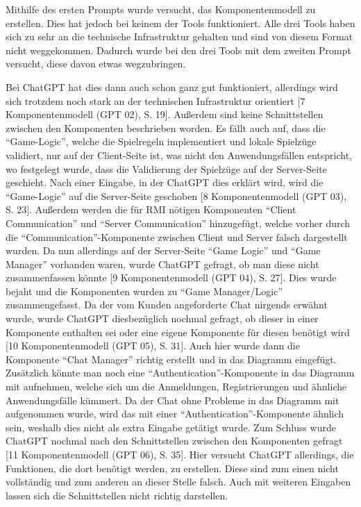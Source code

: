 Mithilfe des ersten Prompts wurde versucht, das Komponentenmodell zu erstellen. Dies hat jedoch bei keinem der Tools funktioniert. Alle drei Tools 
haben sich zu sehr an die technische Infrastruktur gehalten und sind von diesem Format nicht weggekommen. Dadurch wurde bei den drei Tools mit dem 
zweiten Prompt versucht, diese davon etwas wegzubringen.

Bei ChatGPT hat dies dann auch schon ganz gut funktioniert, allerdings wird sich trotzdem noch stark an der technischen Infrastruktur orientiert [7 Komponentenmodell (GPT 02), S. 19]. 
Außerdem sind keine Schnittstellen zwischen den Komponenten beschrieben worden. Es fällt auch auf, dass die ``Game-Logic'', welche die Spielregeln 
implementiert und lokale Spielzüge validiert, nur auf der Client-Seite ist, was nicht den Anwendungsfällen entspricht, wo festgelegt wurde, dass 
die Validierung der Spielzüge auf der Server-Seite geschieht. Nach einer Eingabe, in der ChatGPT dies erklärt wird, wird die ``Game-Logic'' auf die 
Server-Seite geschoben [8 Komponentenmodell (GPT 03), S. 23]. Außerdem werden die für RMI nötigen Komponenten ``Client Communication'' und ``Server Communication'' hinzugefügt, welche 
vorher durch die ``Communication''-Komponente zwischen Client und Server falsch dargestellt wurden. Da nun allerdings auf der Server-Seite ``Game Logic'' 
und ``Game Manager'' vorhanden waren, wurde ChatGPT gefragt, ob man diese nicht zusammenfassen könnte [9 Komponentenmodell (GPT 04), S. 27]. Dies wurde bejaht und die Komponenten wurden 
zu ``Game Manager/Logic'' zusammengefasst. Da der vom Kunden angeforderte Chat nirgends erwähnt wurde, wurde ChatGPT diesbezüglich nochmal gefragt, 
ob dieser in einer Komponente enthalten sei oder eine eigene Komponente für diesen benötigt wird [10 Komponentenmodell (GPT 05), S. 31]. Auch hier wurde dann die Komponente ``Chat Manager'' 
richtig erstellt und in das Diagramm eingefügt. Zusätzlich könnte man noch eine ``Authentication''-Komponente in das Diagramm mit aufnehmen, welche 
sich um die Anmeldungen, Registrierungen und ähnliche Anwendungsfälle kümmert. Da der Chat ohne Probleme in das Diagramm mit aufgenommen 
wurde, wird das mit einer ``Authentication''-Komponente ähnlich sein, weshalb dies nicht als extra Eingabe getätigt wurde. Zum Schluss 
wurde ChatGPT nochmal nach den Schnittstellen zwischen den Komponenten gefragt [11 Komponentenmodell (GPT 06), S. 35]. Hier versucht ChatGPT allerdings, die Funktionen, die 
dort benötigt werden, zu erstellen. Diese sind zum einen nicht vollständig und zum anderen an dieser Stelle falsch. Auch mit weiteren 
Eingaben lassen sich die Schnittstellen nicht richtig darstellen.

